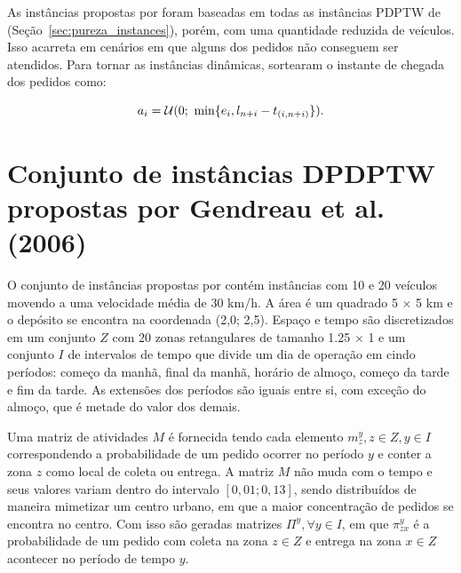 As instâncias propostas por \textcite{fabri_dynamic_2006} foram baseadas em
todas as instâncias PDPTW de \textcite{li_metaheuristic_2003} 
(Seção~\ref{sec:pureza_instances}), porém, com uma quantidade reduzida de 
veículos.
Isso acarreta em cenários em que alguns dos pedidos não conseguem ser 
atendidos.
Para tornar as instâncias dinâmicas, \textcite{fabri_dynamic_2006} sortearam 
o instante de chegada dos pedidos como:

\begin{equation}
  a_{i} = 
  \mathcal{U}(0;\ \min\{e_i, 
      l_{n + i} 
  - t_{(i,n + i)}\}).
  \label{eq:fabri_dynamic_2006_requestArrivalTime}
\end{equation}







\section{Conjunto de instâncias DPDPTW propostas por 
         Gendreau et al. (2006)} 
\label{sec:gendreau_instances}

O conjunto de instâncias propostas por \textcite{gendreau_neighborhood_2006}
contém instâncias com 10 e 20 veículos movendo a uma velocidade média de 30 
km/h. 
A área é um quadrado 5 $\times$ 5 km e o depósito se encontra na coordenada 
(2,0; 2,5). 
Espaço e tempo são discretizados em um conjunto $Z$ com 20 zonas retangulares 
de tamanho 1.25 $\times$ 1 e um conjunto $I$ de intervalos de tempo que 
divide um dia de operação em cindo períodos: começo da manhã, final da manhã, 
horário de almoço, começo da tarde e fim da tarde.
As extensões dos períodos são iguais entre si, com exceção do almoço, que é
metade do valor dos demais.

Uma matriz de atividades $M$ é fornecida tendo cada elemento 
$m_z^y, z \in Z, y \in I$ correspondendo a probabilidade de um pedido 
ocorrer no período $y$ e conter a zona $z$ como local de coleta ou entrega. 
A matriz $M$ não muda com o tempo e seus valores variam dentro do intervalo
$[0,01; 0,13]$, sendo distribuídos de maneira mimetizar um centro urbano, em
que a maior concentração de pedidos se encontra no centro.
Com isso são geradas matrizes $\Pi^y, \forall y \in I$, em que $\pi_{zx}^y$ é a
probabilidade de um pedido com coleta na zona $z \in Z$ e entrega na zona $x
\in Z$ acontecer no período de tempo $y$.

